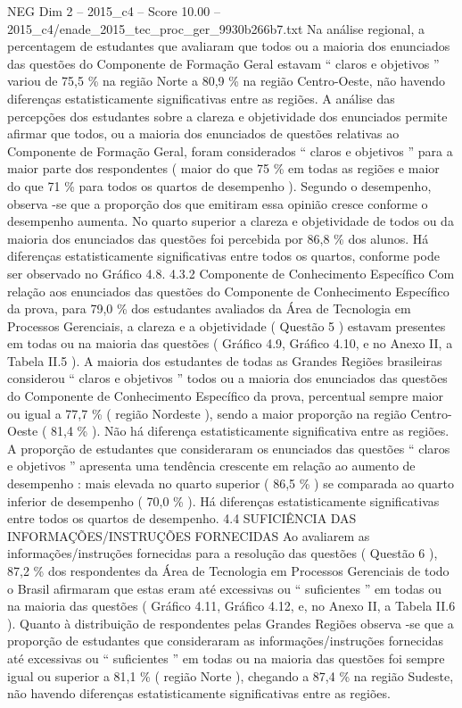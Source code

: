 \begin{textsample}{NEG Dim 2 – 2015\_c4 – Score 10.00 – 2015\_c4/enade\_2015\_tec\_proc\_ger\_9930b266b7.txt}
Na análise regional, a percentagem de estudantes que avaliaram que todos ou a maioria dos enunciados das questões do Componente de Formação Geral estavam “ claros e objetivos ” variou de 75,5 \% na região Norte a 80,9 \% na região Centro-Oeste, não havendo diferenças estatisticamente significativas entre as regiões.
A análise das percepções dos estudantes sobre a clareza e objetividade dos enunciados permite afirmar que todos, ou a maioria dos enunciados de questões relativas ao Componente de Formação Geral, foram considerados “ claros e objetivos ” para a maior parte dos respondentes ( maior do que 75 \% em todas as regiões e maior do que 71 \% para todos os quartos de desempenho ).
Segundo o desempenho, observa -se que a proporção dos que emitiram essa opinião cresce conforme o desempenho aumenta.
No quarto superior a clareza e objetividade de todos ou da maioria dos enunciados das questões foi percebida por 86,8 \% dos alunos.
Há diferenças estatisticamente significativas entre todos os quartos, conforme pode ser observado no Gráfico 4.8. 4.3.2 Componente de Conhecimento Específico Com relação aos enunciados das questões do Componente de Conhecimento Específico da prova, para 79,0 \% dos estudantes avaliados da Área de Tecnologia em Processos Gerenciais, a clareza e a objetividade ( Questão 5 ) estavam presentes em todas ou na maioria das questões ( Gráfico 4.9, Gráfico 4.10, e no Anexo II, a Tabela II.5 ).
A maioria dos estudantes de todas as Grandes Regiões brasileiras considerou “ claros e objetivos ” todos ou a maioria dos enunciados das questões do Componente de Conhecimento Específico da prova, percentual sempre maior ou igual a 77,7 \% ( região Nordeste ), sendo a maior proporção na região Centro-Oeste ( 81,4 \% ).
Não há diferença estatisticamente significativa entre as regiões.
A proporção de estudantes que consideraram os enunciados das questões “ claros e objetivos ” apresenta uma tendência crescente em relação ao aumento de desempenho : mais elevada no quarto superior ( 86,5 \% ) se comparada ao quarto inferior de desempenho ( 70,0 \% ).
Há diferenças estatisticamente significativas entre todos os quartos de desempenho. 4.4 SUFICIÊNCIA DAS INFORMAÇÕES/INSTRUÇÕES FORNECIDAS Ao avaliarem as informações/instruções fornecidas para a resolução das questões ( Questão 6 ), 87,2 \% dos respondentes da Área de Tecnologia em Processos Gerenciais de todo o Brasil afirmaram que estas eram até excessivas ou “ suficientes ” em todas ou na maioria das questões ( Gráfico 4.11, Gráfico 4.12, e, no Anexo II, a Tabela II.6 ).
Quanto à distribuição de respondentes pelas Grandes Regiões observa -se que a proporção de estudantes que consideraram as informações/instruções fornecidas até excessivas ou “ suficientes ” em todas ou na maioria das questões foi sempre igual ou superior a 81,1 \% ( região Norte ), chegando a 87,4 \% na região Sudeste, não havendo diferenças estatisticamente significativas entre as regiões.

\end{textsample}
